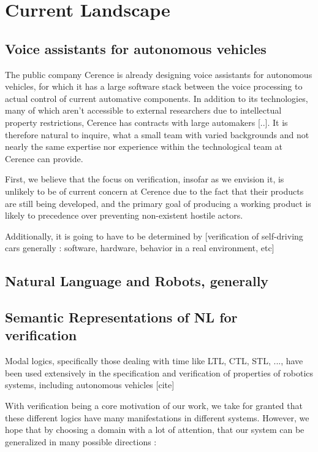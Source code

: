 \documentclass[a4paper, 11pt]{article}
\begin{document}
\section{Current Landscape} 

\subsection{Voice assistants for autonomous vehicles}

The public company Cerence \cite{} is already designing voice assistants for autonomous
vehicles, for which it has a large software stack between the voice processing
to actual control of current automative components. In addition to its 
technologies, many of which aren't accessible to external researchers due to
intellectual property restrictions, Cerence has contracts with large automakers
[..]. It is therefore natural to inquire, what a small team with varied
backgrounds and not nearly the same expertise nor experience within the
technological team at Cerence can provide.

First, we believe that the focus on verification, insofar as we envision it, is
unlikely to be of current concern at Cerence due to the fact that their products
are still being developed, and the primary goal of producing a working product
is likely to precedence over preventing non-existent hostile actors.

Additionally, it is going to have to be determined by 
[verification of self-driving cars generally : software, hardware, behavior in
a real environment, etc]


\subsection{Natural Language and Robots, generally}

\subsection{Semantic Representations of NL for verification}

Modal logics, specifically those dealing with time like LTL, CTL, STL, ..., have
been used extensively in the specification and verification of properties of
robotics systems, including autonomous vehicles [cite]

With verification being a core motivation of our work, we take for granted that
these different logics have many manifestations in different systems. However,
we hope that by choosing a domain with a lot of attention, that our system can
be generalized in many possible directions :
\end{document}

